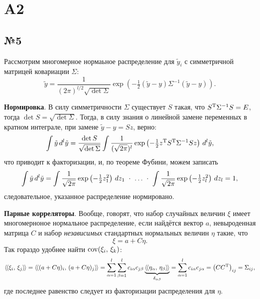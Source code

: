 \section{A2}

\subsection*{№5}


Рассмотрим многомерное нормаьное распределение для $\tilde{y}_i$ с симметричной матрицей ковариации $\Sigma$:
\begin{equation*}
    \tilde{y} = \frac{1}{(2\pi)^{l/2} \sqrt{\det \Sigma}} \exp\left(
        - \tfrac{1}{2} (\tilde{y}-y) \Sigma^{-1} (\tilde{y} - y)
    \right).
\end{equation*}

\textbf{Нормировка}. В силу симметричности $\Sigma$ существует $S$ такая, что $S^{\text{T}} \Sigma^{-1} S = E$, тогда $\det S = \sqrt{\det \Sigma}$. Тогда, в силу знания о линейной замене переменных в кратном интеграле, при замене $\tilde{y} - y = Sz$, верно:
\begin{equation*}
    \int \tilde{y} \, d^l \tilde{y} =  
    \frac{\det S}{\sqrt{\det \Sigma}} \int 
    \frac{1}{(\sqrt{2\pi})^l} \exp\left(
        - \tfrac{1}{2} z^{\text{T}} S^{\text{T}} \Sigma^{-1} S z
    \right)
    \, d^l \tilde{y},
\end{equation*}
что приводит к факторизации, и, по теореме Фубини, можем записать
\begin{equation*}
    \int \tilde{y} \, d^l \tilde{y} = 
    \int \frac{1}{\sqrt{2\pi}} \exp\left(-\tfrac{1}{2} z_1^2 \right) \, d z_1 
    \ \cdot \
    \ldots
    \ \cdot \
    \int \frac{1}{\sqrt{2\pi}} \exp\left(-\tfrac{1}{2} z_l^2 \right) \, d z_l = 1,
\end{equation*}
следовательное, указанное распределение нормировано.


\textbf{Парные корреляторы}. Вообще, говорят, что набор случайных величин $\xi$ имеет многомерноное нормальное распределение, если найдётся вектор $a$, невыроденная матрица $C$ и набор \textit{независимых} стандартных нормальных величин $\eta$ такие, что
\begin{equation*}
    \xi = a + C \eta.
\end{equation*}
Так гораздо удобнее найти $\mathop{\mathrm{cov}}\nolimits (\xi_i,\, \xi_k)$:
\begin{equation*}
    \langle\hspace{-1.2pt}\langle \xi_i,\, \xi_j \rangle\hspace{-1.2pt}\rangle = \langle\hspace{-1.2pt}\langle (a + C \eta)_i,\, (a + C \eta)_j \rangle\hspace{-1.2pt}\rangle = 
    \sum_{\alpha=1}^{l} \sum_{\beta=1}^{l} c_{i \alpha} c_{j \beta} 
    \underbrace{\langle\hspace{-1.2pt}\langle \eta_{\alpha},\, \eta_\beta \rangle\hspace{-1.2pt}\rangle}_{\delta_{\alpha \beta}} = 
    \sum_{\alpha=1}^{l} c_{i\alpha} c_{j \alpha} = \left(C C^{\text{T}}\right)_{ij} = \Sigma_{ij},
\end{equation*}
где последнее равенство следует из факторизации распределения для $\eta$. 


